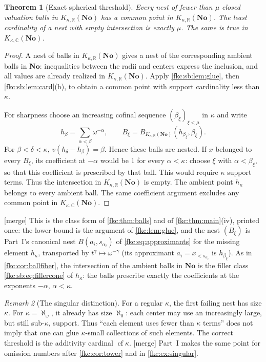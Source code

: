 \documentclass[11pt,letterpaper]{article}
\numberwithin{equation}{section}
\newtheorem{theorem}{Theorem}[section]
\theoremstyle{definition}
\theoremstyle{remark}
\newtheorem{remark}[theorem]{Remark}
\newcommand{\R}{\mathbb R}
\newcommand{\C}{\mathbb C}
\newcommand{\No}{\mathbf{No}}
\newcommand{\cf}{\operatorname{cf}}
\newcommand{\mergetag}{\textup{\textsf{\small[merge]}}}%
\newcommand{\KN}[2]{K_{#1,#2}(\No)}%
\begin{document}
\begin{theorem}[Exact spherical threshold]\label{fkc:sb:thm:spherical}
Every nest of fewer than $\mu$ closed valuation balls in $\KN\kappa\R$ has a common point in $\KN\kappa\R$. The least cardinality of a nest with empty intersection is exactly $\mu$. The same is true in $\KN\kappa\C$.
\end{theorem}
\begin{proof}
A nest of balls in $\KN\kappa\R$ gives a nest of the corresponding ambient balls in $\No$: inequalities between the radii and centers express the inclusion, and all values are already realized in $\KN\kappa\R$. Apply \cref{fkc:sb:lem:glue}, then \cref{fkc:sb:lem:card}(b), to obtain a common point with support cardinality less than $\kappa$.

For sharpness choose an increasing cofinal sequence $(\beta_\xi)_{\xi<\mu}$ in $\kappa$ and write
\[
 h_\beta=\sum_{\alpha<\beta}\omega^{-\alpha},\qquad
 B_\xi=B_{\KN\kappa\R}(h_{\beta_\xi},\beta_\xi).
\]
For $\beta<\delta<\kappa$, $v(h_\delta-h_\beta)=\beta$. Hence these balls are nested. If $x$ belonged to every $B_\xi$, its coefficient at $-\alpha$ would be $1$ for every $\alpha<\kappa$: choose $\xi$ with $\alpha<\beta_\xi$, so that this coefficient is prescribed by that ball. This would require $\kappa$ support terms. Thus the intersection in $\KN\kappa\R$ is empty. The ambient point $h_\kappa$ belongs to every ambient ball. The same coefficient argument excludes any common point in $\KN\kappa\C$.
\end{proof}
\mergetag{} This is the class form of \cref{fkc:thm:balls} and of \cref{fkc:thm:main}(iv), printed once: the lower bound is the argument of \cref{fkc:lem:glue}, and the nest $(B_\xi)$ is Part~I's canonical nest $B(a_i,s_{\alpha_i})$ of \eqref{fkc:eq:approximants} for the missing element $h_\kappa$, transported by $t^\gamma\mapsto\omega^{-\gamma}$ (its approximant $a_i=x_{<s_{\alpha_i}}$ is $h_{\beta_\xi}$). As in \cref{fkc:cor:ballfiber}, the intersection of the ambient balls in $\No$ is the filler class \eqref{fkc:sb:eq:fillercone} of $h_\kappa$: the balls prescribe exactly the coefficients at the exponents $-\alpha$, $\alpha<\kappa$.

\begin{remark}[The singular distinction]\label{fkc:sb:rem:singular}
For a regular $\kappa$, the first failing nest has size $\kappa$. For $\kappa=\aleph_\omega$, it already has size $\aleph_0$: each center may use an increasingly large, but still sub-$\kappa$, support. Thus ``each element uses fewer than $\kappa$ terms'' does not imply that one can glue $\kappa$-small collections of such elements. The correct threshold is the additivity cardinal $\cf\kappa$. \mergetag{} Part~I makes the same point for omission numbers after \cref{fkc:cor:tower} and in \cref{fkc:ex:singular}.
\end{remark}
\end{document}
